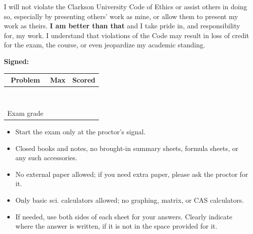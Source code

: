 \documentclass[10pt,twoside,sfsidenotes]{tufte-handout}
\date{} %
\begin{document}
\setlength\abovedisplayskip{2pt}
\setlength\belowdisplayskip{2pt}
\setlength\abovedisplayshortskip{2pt}
\setlength\belowdisplayshortskip{2pt}

\vspace*{1in}


   {\large I will not violate the Clarkson University Code of Ethics or assist others in doing so, especially by presenting others' work as mine, or allow them to present my work as theirs. \textbf{I am better than that} and I take pride in, and responsibility for, my work. I understand that violations of the Code may result in loss of credit for the exam, the course, or even jeopardize my academic standing.

\vspace{.5in}

    \textbf{Signed:}
  }

  \vfill


\begin{center}\Large
  \begin{tabular}{c | c | c}
    Problem & Max & Scored \\ \hline
     & & \\ \hline
     & & \\ \hline
     & & \\ \hline
     & & \\ \hline
     & & \\ \hline
     & & \\ \hline
     & & \\ \hline
     & & \\ \hline
    Exam grade & & \\ \hline
  \end{tabular}
  \end{center}

  \vfill

  \begin{fullwidth}
{\large
  \begin{itemize}
    \item Start the exam only at the proctor's signal.
  \item Closed books and notes, no brought-in summary sheets, formula sheets, or any such accessories.
  \item No external paper allowed; if you need extra paper, please ask the proctor for it.
  \item Only basic sci. calculators allowed; no graphing, matrix, or CAS calculators.
  \item If needed, use both sides of each sheet for your answers. Clearly indicate where the answer is written, if it is not in the space provided for it.
  \end{itemize}
  }
\end{fullwidth}
\clearpage
\end{document}
